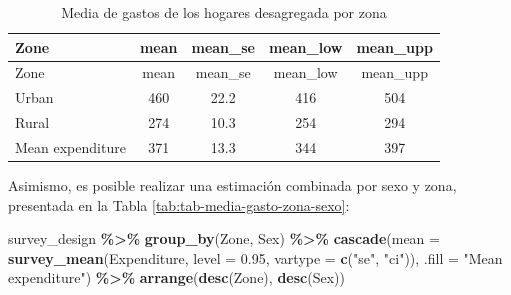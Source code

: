 \documentclass[
  spanish,
  12pt,
]{book}
\newenvironment{Shaded}{\begin{snugshade}}{\end{snugshade}}
\newcommand{\AttributeTok}[1]{\textcolor[rgb]{0.13,0.29,0.53}{#1}}
\newcommand{\FloatTok}[1]{\textcolor[rgb]{0.00,0.00,0.81}{#1}}
\newcommand{\FunctionTok}[1]{\textcolor[rgb]{0.13,0.29,0.53}{\textbf{#1}}}
\newcommand{\NormalTok}[1]{#1}
\newcommand{\SpecialCharTok}[1]{\textcolor[rgb]{0.81,0.36,0.00}{\textbf{#1}}}
\newcommand{\StringTok}[1]{\textcolor[rgb]{0.31,0.60,0.02}{#1}}
\begin{document}
\begin{longtable}[]{@{}lcccc@{}}
\caption{\label{tab:tab-media-gasto-zona}Media de gastos de los hogares desagregada por zona}\tabularnewline
\toprule\noalign{}
Zone & mean & mean\_se & mean\_low & mean\_upp \\
\midrule\noalign{}
\endfirsthead
\toprule\noalign{}
Zone & mean & mean\_se & mean\_low & mean\_upp \\
\midrule\noalign{}
\endhead
\bottomrule\noalign{}
\endlastfoot
Urban & 460 & 22.2 & 416 & 504 \\
Rural & 274 & 10.3 & 254 & 294 \\
Mean expenditure & 371 & 13.3 & 344 & 397 \\
\end{longtable}

Asimismo, es posible realizar una estimación combinada por sexo y zona, presentada en la Tabla \ref{tab:tab-media-gasto-zona-sexo}:

\begin{Shaded}
\begin{Highlighting}[]
\NormalTok{survey\_design }\SpecialCharTok{\%\textgreater{}\%}
  \FunctionTok{group\_by}\NormalTok{(Zone, Sex) }\SpecialCharTok{\%\textgreater{}\%}
  \FunctionTok{cascade}\NormalTok{(}\AttributeTok{mean =} \FunctionTok{survey\_mean}\NormalTok{(Expenditure,}
                              \AttributeTok{level =} \FloatTok{0.95}\NormalTok{,}
                              \AttributeTok{vartype =} \FunctionTok{c}\NormalTok{(}\StringTok{"se"}\NormalTok{, }\StringTok{"ci"}\NormalTok{)),}
        \AttributeTok{.fill =} \StringTok{"Mean expenditure"}\NormalTok{) }\SpecialCharTok{\%\textgreater{}\%}
  \FunctionTok{arrange}\NormalTok{(}\FunctionTok{desc}\NormalTok{(Zone), }\FunctionTok{desc}\NormalTok{(Sex))}
\end{Highlighting}
\end{Shaded}
\end{document}
